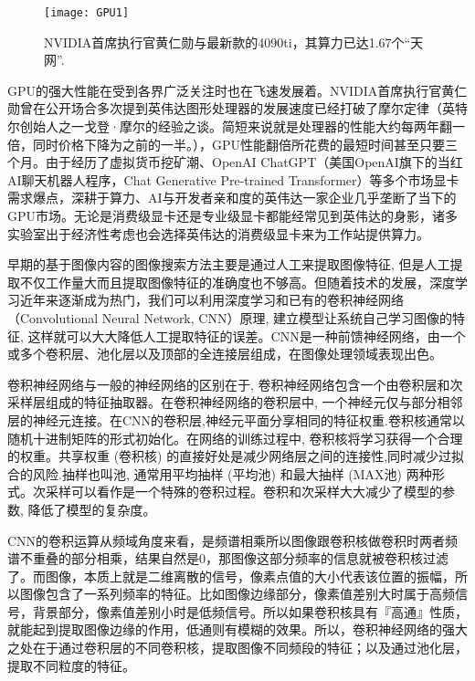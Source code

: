 \documentclass[bachelor_p]{hdu-thesis}
\begin{document}
\begin{figure}[!htb]
  \centering
  \texttt{[image: GPU1]}
  \caption{NVIDIA首席执行官黄仁勋与最新款的4090ti，其算力已达1.67个“天网”.}
  \label{fig_GPU1}
\end{figure}

GPU的强大性能在受到各界广泛关注时也在飞速发展着。NVIDIA首席执行官黄仁勋曾在公开场合多次提到英伟达图形处理器的发展速度已经打破了摩尔定律（英特尔创始人之一戈登·摩尔的经验之谈。简短来说就是处理器的性能大约每两年翻一倍，同时价格下降为之前的一半。），GPU性能翻倍所花费的最短时间甚至只要三个月。由于经历了虚拟货币挖矿潮、OpenAI ChatGPT（美国OpenAI旗下的当红AI聊天机器人程序，Chat Generative Pre-trained Transformer）等多个市场显卡需求爆点，深耕于算力、AI与开发者亲和度的英伟达一家企业几乎垄断了当下的GPU市场。无论是消费级显卡还是专业级显卡都能经常见到英伟达的身影，诸多实验室出于经济性考虑也会选择英伟达的消费级显卡来为工作站提供算力。

早期的基于图像内容的图像搜索方法主要是通过人工来提取图像特征, 但是人工提取不仅工作量大而且提取图像特征的准确度也不够高。但随着技术的发展，深度学习近年来逐渐成为热门，我们可以利用深度学习和已有的卷积神经网络（Convolutional Neural Network, CNN）原理, 建立模型让系统自己学习图像的特征, 这样就可以大大降低人工提取特征的误差\citep{CNN1}。CNN是一种前馈神经网络，由一个或多个卷积层、池化层以及顶部的全连接层组成，在图像处理领域表现出色。

卷积神经网络与一般的神经网络的区别在于, 卷积神经网络包含一个由卷积层和次采样层组成的特征抽取器。在卷积神经网络的卷积层中, 一个神经元仅与部分相邻层的神经元连接。在CNN的卷积层,神经元平面分享相同的特征权重.卷积核通常以随机十进制矩阵的形式初始化。在网络的训练过程中, 卷积核将学习获得一个合理的权重。共享权重 (卷积核) 的直接好处是减少网络层之间的连接性,同时减少过拟合的风险.抽样也叫池, 通常用平均抽样 (平均池) 和最大抽样 (MAX池) 两种形式。次采样可以看作是一个特殊的卷积过程。卷积和次采样大大减少了模型的参数, 降低了模型的复杂度\citep{CNN1}。

CNN的卷积运算从频域角度来看，是频谱相乘所以图像跟卷积核做卷积时两者频谱不重叠的部分相乘，结果自然是0，那图像这部分频率的信息就被卷积核过滤了。而图像，本质上就是二维离散的信号，像素点值的大小代表该位置的振幅，所以图像包含了一系列频率的特征。比如图像边缘部分，像素值差别大时属于高频信号，背景部分，像素值差别小时是低频信号。所以如果卷积核具有『高通』性质，就能起到提取图像边缘的作用，低通则有模糊的效果。所以，卷积神经网络的强大之处在于通过卷积层的不同卷积核，提取图像不同频段的特征；以及通过池化层，提取不同粒度的特征\citep{CNN2}。
\end{document}
